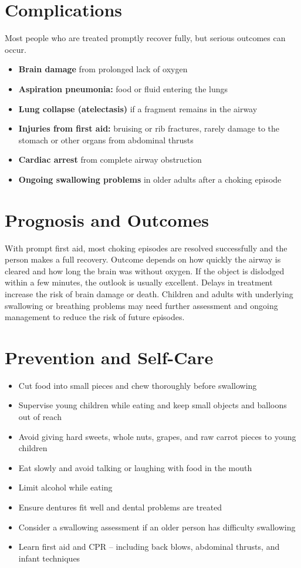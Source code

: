 \section*{Complications}
Most people who are treated promptly recover fully, but serious outcomes can occur.

\begin{itemize}
    \item \textbf{Brain damage} from prolonged lack of oxygen
    \item \textbf{Aspiration pneumonia:} food or fluid entering the lungs
    \item \textbf{Lung collapse (atelectasis)} if a fragment remains in the airway
    \item \textbf{Injuries from first aid:} bruising or rib fractures, rarely damage to the stomach or other organs from abdominal thrusts
    \item \textbf{Cardiac arrest} from complete airway obstruction
    \item \textbf{Ongoing swallowing problems} in older adults after a choking episode
\end{itemize}

\section*{Prognosis and Outcomes}
With prompt first aid, most choking episodes are resolved successfully and the person makes a full recovery. Outcome depends on how quickly the airway is cleared and how long the brain was without oxygen. If the object is dislodged within a few minutes, the outlook is usually excellent. Delays in treatment increase the risk of brain damage or death. Children and adults with underlying swallowing or breathing problems may need further assessment and ongoing management to reduce the risk of future episodes.

\section*{Prevention and Self-Care}
\begin{itemize}
    \item Cut food into small pieces and chew thoroughly before swallowing
    \item Supervise young children while eating and keep small objects and balloons out of reach
    \item Avoid giving hard sweets, whole nuts, grapes, and raw carrot pieces to young children
    \item Eat slowly and avoid talking or laughing with food in the mouth
    \item Limit alcohol while eating
    \item Ensure dentures fit well and dental problems are treated
    \item Consider a swallowing assessment if an older person has difficulty swallowing
    \item Learn first aid and CPR -- including back blows, abdominal thrusts, and infant techniques
\end{itemize}

